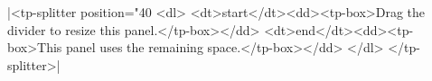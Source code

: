 \documentclass{article}
\begin{document}
\rawhtml|<tp-splitter position="40%
  <dl>
    <dt>start</dt><dd><tp-box>Drag the divider to resize this panel.</tp-box></dd>
    <dt>end</dt><dd><tp-box>This panel uses the remaining space.</tp-box></dd>
  </dl>
</tp-splitter>|
\end{document}
